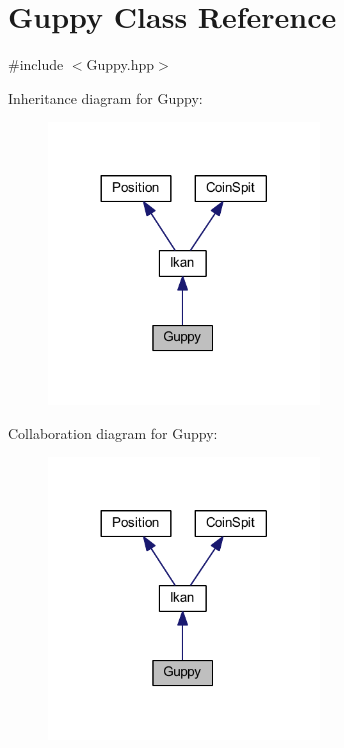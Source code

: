 \hypertarget{class_guppy}{}\section{Guppy Class Reference}
\label{class_guppy}


{\ttfamily \#include $<$Guppy.\+hpp$>$}



Inheritance diagram for Guppy\+:\nopagebreak
\begin{figure}[H]
\begin{center}
\leavevmode
\includegraphics[width=204pt]{class_guppy__inherit__graph}
\end{center}
\end{figure}


Collaboration diagram for Guppy\+:\nopagebreak
\begin{figure}[H]
\begin{center}
\leavevmode
\includegraphics[width=204pt]{class_guppy__coll__graph}
\end{center}
\end{figure}
